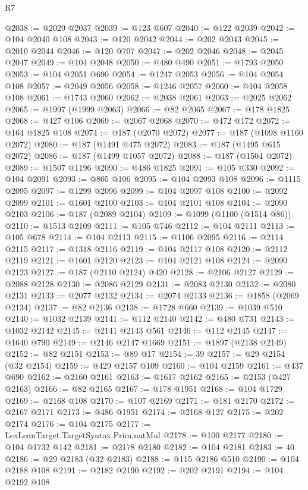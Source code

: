 \begin{lexlean}{R7}
\begin{coremodule}
@2038 := @2029 @2037
@2039 := @123 @607
@2040 := @122 @2039
@2042 := @104 @2040 @108
@2043 := @120 @2042
@2044 := @202 @2043
@2045 := @2010 @2044
@2046 := @120 @707
@2047 := @202 @2046
@2048 := @2045 @2047
@2049 := @104 @2048
@2050 := @480 @490
@2051 := @1793 @2050
@2053 := @104 @2051 @690
@2054 := @1247 @2053
@2056 := @104 @2054 @108
@2057 := @2049 @2056
@2058 := @1246 @2057
@2060 := @104 @2058 @108
@2061 := @1743 @2060
@2062 := @2038 @2061
@2063 := @2025 @2062
@2065 := @1997 (@1999 @2063)
@2066 := @82 @2065
@2067 := @178 @1825
@2068 := @427 @106
@2069 := @2067 @2068
@2070 := @472 @172
@2072 := @164 @1825 @108
@2074 := @187 (@2070 @2072)
@2077 := @187 (@1098 @1160 @2072)
@2080 := @187 (@1491 @475 @2072)
@2083 := @187 (@1495 @615 @2072)
@2086 := @187 (@1499 @1057 @2072)
@2088 := @187 (@1504 @2072)
@2089 := @1507 @1196
@2090 := @486 @1825
@2091 := @105 @330
@2092 := @104 @2091
@2093 := @805 @106
@2095 := @104 @2093 @108
@2096 := @1115 @2095
@2097 := @1299 @2096
@2099 := @104 @2097 @108
@2100 := @2092 @2099
@2101 := @1601 @2100
@2103 := @104 @2101 @108
@2104 := @2090 @2103
@2106 := @187 (@2089 @2104)
@2109 := @1099 (@1100 (@1514 @86))
@2110 := @1513 @2109
@2111 := @105 @746
@2112 := @104 @2111
@2113 := @105 @678
@2114 := @104 @2113
@2115 := @1106 @2095
@2116 := @2114 @2115
@2117 := @1318 @2116
@2119 := @104 @2117 @108
@2120 := @2112 @2119
@2121 := @1601 @2120
@2123 := @104 @2121 @108
@2124 := @2090 @2123
@2127 := @187 (@2110 @2124) @420
@2128 := @2106 @2127
@2129 := @2088 @2128
@2130 := @2086 @2129
@2131 := @2083 @2130
@2132 := @2080 @2131
@2133 := @2077 @2132
@2134 := @2074 @2133
@2136 := @1858 (@2069 @2134)
@2137 := @82 @2136
@2138 := @1728 @660
@2139 := @1039 @510
@2140 := @1032 @2139
@2141 := @112 @2140
@2142 := @480 @731
@2143 := @1032 @2142
@2145 := @2141 @2143 @561
@2146 := @112 @2145
@2147 := @1640 @790
@2149 := @2146 @2147 @1669
@2151 := @1897 (@2138 @2149)
@2152 := @82 @2151
@2153 := @89 @17
@2154 := 39
@2157 := @29 @2154 (@32 @2154)
@2159 := @429 @2157 @109
@2160 := @104 @2159
@2161 := @437 @690
@2162 := @2160 @2161
@2163 := @1617 @2162
@2165 := @2153 (@427 @2163)
@2166 := @82 @2165
@2167 := @178 @1951
@2168 := @104 @1729
@2169 := @2168 @108
@2170 := @107 @2169
@2171 := @181 @2170
@2172 := @2167 @2171
@2173 := @486 @1951
@2174 := @2168 @127
@2175 := @202 @2174
@2176 := @104 @2175
@2177 := LexLeanTarget.TargetSyntax.Prim.natMul
@2178 := @100 @2177
@2180 := @104 @1732 @142
@2181 := @2178 @2180
@2182 := @104 @2181
@2183 := 40
@2186 := @29 @2183 (@32 @2183)
@2188 := @115 @2186 @510
@2190 := @104 @2188 @108
@2191 := @2182 @2190
@2192 := @202 @2191
@2194 := @104 @2192 @108

\end{coremodule}
\end{lexlean}
